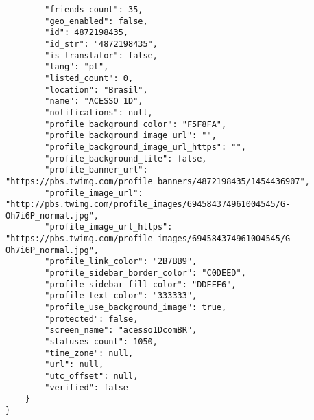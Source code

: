 \begin{lstlisting}
        "friends_count": 35,
        "geo_enabled": false,
        "id": 4872198435,
        "id_str": "4872198435",
        "is_translator": false,
        "lang": "pt",
        "listed_count": 0,
        "location": "Brasil",
        "name": "ACESSO 1D",
        "notifications": null,
        "profile_background_color": "F5F8FA",
        "profile_background_image_url": "",
        "profile_background_image_url_https": "",
        "profile_background_tile": false,
        "profile_banner_url": "https://pbs.twimg.com/profile_banners/4872198435/1454436907",
        "profile_image_url": "http://pbs.twimg.com/profile_images/694584374961004545/G-Oh7i6P_normal.jpg",
        "profile_image_url_https": "https://pbs.twimg.com/profile_images/694584374961004545/G-Oh7i6P_normal.jpg",
        "profile_link_color": "2B7BB9",
        "profile_sidebar_border_color": "C0DEED",
        "profile_sidebar_fill_color": "DDEEF6",
        "profile_text_color": "333333",
        "profile_use_background_image": true,
        "protected": false,
        "screen_name": "acesso1DcomBR",
        "statuses_count": 1050,
        "time_zone": null,
        "url": null,
        "utc_offset": null,
        "verified": false
    }
}


\end{lstlisting}